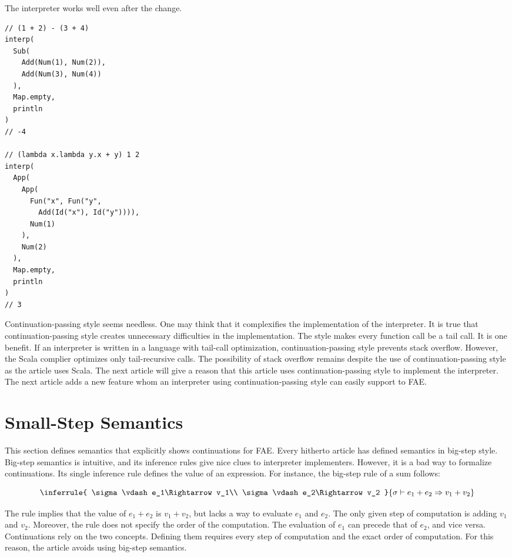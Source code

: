 The interpreter works well even after the change.

\begin{verbatim}
// (1 + 2) - (3 + 4)
interp(
  Sub(
    Add(Num(1), Num(2)),
    Add(Num(3), Num(4))
  ),
  Map.empty,
  println
)
// -4

// (lambda x.lambda y.x + y) 1 2
interp(
  App(
    App(
      Fun("x", Fun("y",
        Add(Id("x"), Id("y")))),
      Num(1)
    ),
    Num(2)
  ),
  Map.empty,
  println
)
// 3
\end{verbatim}

Continuation-passing style seems needless. One may think that it complexifies the
implementation of the interpreter. It is true that continuation-passing style
creates unnecessary difficulties in the implementation. The style makes every
function call be a tail call. It is one benefit. If an interpreter is written in
a language with tail-call optimization, continuation-passing style prevents stack
overflow. However, the Scala complier optimizes only tail-recursive calls. The
possibility of stack overflow remains despite the use of continuation-passing
style as the article uses Scala. The next article will give a reason that this
article uses continuation-passing style to implement the interpreter. The next
article adds a new feature whom an interpreter using continuation-passing style
can easily support to FAE.

\section{Small-Step Semantics}

This section defines semantics that explicitly shows continuations for FAE. Every
hitherto article has defined semantics in big-step style. Big-step semantics is
intuitive, and its inference rules give nice clues to interpreter implementers.
However, it is a bad way to formalize continuations. Its single inference rule
defines the value of an expression. For instance, the big-step rule of a sum
follows:

\[
\inferrule
{ \sigma\vdash e_1\Rightarrow v_1\\
  \sigma\vdash e_2\Rightarrow v_2 }
{ \sigma\vdash e_1+e_2\Rightarrow v_1+v_2 }
\]

The rule implies that the value of $e_1+e_2$ is $v_1+v_2$, but lacks a way to
evaluate $e_1$ and $e_2$. The only given step of computation is adding $v_1$ and
$v_2$. Moreover, the rule does not specify the order of the computation. The
evaluation of $e_1$ can precede that of $e_2$, and vice versa. Continuations rely
on the two concepts. Defining them requires every step of computation and the
exact order of computation. For this reason, the article avoids using big-step
semantics.

